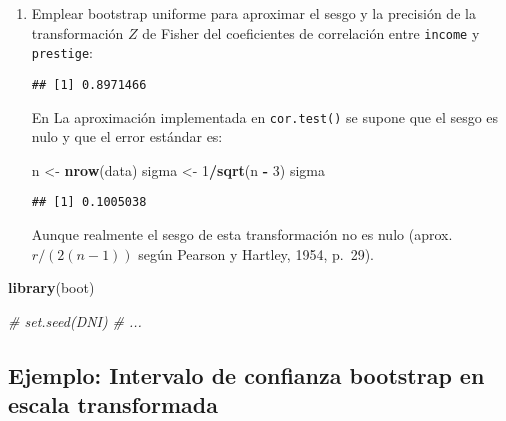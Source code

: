 \documentclass[
]{book}
\newenvironment{Shaded}{\begin{snugshade}}{\end{snugshade}}
\newcommand{\CommentTok}[1]{\textcolor[rgb]{0.56,0.35,0.01}{\textit{#1}}}
\newcommand{\DecValTok}[1]{\textcolor[rgb]{0.00,0.00,0.81}{#1}}
\newcommand{\KeywordTok}[1]{\textcolor[rgb]{0.13,0.29,0.53}{\textbf{#1}}}
\newcommand{\NormalTok}[1]{#1}
\newcommand{\OperatorTok}[1]{\textcolor[rgb]{0.81,0.36,0.00}{\textbf{#1}}}
\newcommand{\StringTok}[1]{\textcolor[rgb]{0.31,0.60,0.02}{#1}}
\theoremstyle{definition}
\theoremstyle{definition}
\theoremstyle{definition}
\theoremstyle{remark}
\begin{document}
\begin{enumerate}
\def\labelenumi{\arabic{enumi}.}
\item
  Emplear bootstrap uniforme para aproximar el sesgo y la precisión de la transformación
  \(Z\) de Fisher del coeficientes de correlación entre \texttt{income} y \texttt{prestige}:

\begin{Shaded}
\end{Shaded}

\begin{verbatim}
## [1] 0.8971466
\end{verbatim}

  En La aproximación implementada en \texttt{cor.test()} se supone que
  el sesgo es nulo y que el error estándar es:

\begin{Shaded}
\begin{Highlighting}[]
\NormalTok{n <-}\StringTok{ }\KeywordTok{nrow}\NormalTok{(data)}
\NormalTok{sigma <-}\StringTok{ }\DecValTok{1}\OperatorTok{/}\KeywordTok{sqrt}\NormalTok{(n }\OperatorTok{-}\StringTok{ }\DecValTok{3}\NormalTok{)}
\NormalTok{sigma}
\end{Highlighting}
\end{Shaded}

\begin{verbatim}
## [1] 0.1005038
\end{verbatim}

  Aunque realmente el sesgo de esta transformación no es nulo
  (aprox. \(r/(2(n-1))\) según Pearson y Hartley, 1954, p.~29).
\end{enumerate}

\begin{Shaded}
\begin{Highlighting}[]
\KeywordTok{library}\NormalTok{(boot)}

\CommentTok{# set.seed(DNI)}
\CommentTok{# ...}
\end{Highlighting}
\end{Shaded}

\hypertarget{ejemplo-intervalo-de-confianza-bootstrap-en-escala-transformada}{%
\subsection{Ejemplo: Intervalo de confianza bootstrap en escala transformada}\label{ejemplo-intervalo-de-confianza-bootstrap-en-escala-transformada}}
\end{document}
